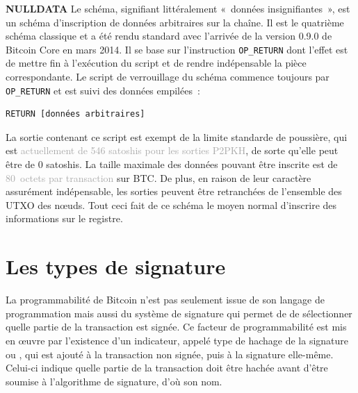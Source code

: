 \textbf{NULLDATA} Le schéma, signifiant littéralement «~données insignifiantes~», est un schéma d'inscription de données arbitraires sur la chaîne. Il est le quatrième schéma classique et a été rendu standard avec l'arrivée de la version 0.9.0 de Bitcoin Core en mars 2014. Il se base sur l'instruction \texttt{OP\_RETURN} dont l'effet est de mettre fin à l'exécution du script et de rendre indépensable la pièce correspondante. Le script de verrouillage du schéma commence toujours par \texttt{OP\_RETURN} et est suivi des données empilées~:

\begin{Verbatim}[fontsize=\small]
RETURN [données arbitraires]
\end{Verbatim}

La sortie contenant ce script est exempt de la limite standarde de poussière, qui est \textcolor{darkgray}{actuellement de 546 satoshis pour les sorties P2PKH}, de sorte qu'elle peut être de 0 satoshis. La taille maximale des données pouvant être inscrite est de \textcolor{darkgray}{80~octets par transaction} sur BTC. De plus, en raison de leur caractère assurément indépensable, les sorties peuvent être retranchées de l'ensemble des UTXO des nœuds. Tout ceci fait de ce schéma le moyen normal d'inscrire des informations sur le registre.

\section*{Les types de signature}


La programmabilité de Bitcoin n'est pas seulement issue de son langage de programmation mais aussi du système de signature qui permet de de sélectionner quelle partie de la transaction est signée. Ce facteur de programmabilité est mis en œuvre par l'existence d'un indicateur, appelé type de hachage de la signature ou , qui est ajouté à la transaction non signée, puis à la signature elle-même. Celui-ci indique quelle partie de la transaction doit être hachée avant d'être soumise à l'algorithme de signature, d'où son nom.

